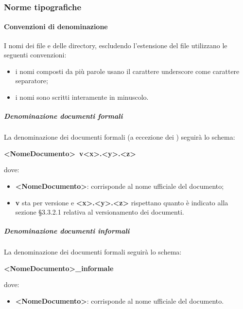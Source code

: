         \subsubsection{Norme tipografiche}
            \paragraph{Convenzioni di denominazione}
                I nomi dei file e delle directory, escludendo l’estensione del file utilizzano le seguenti convenzioni:\\
                \begin{itemize}
                    \item i nomi composti da più parole usano il carattere underscore come carattere separatore;
                    \item i nomi sono scritti interamente in minuscolo.
                \end{itemize}
                \subparagraph{Denominazione documenti formali}
                    La denominazione dei documenti formali (a eccezione dei ) seguirà lo schema:  \\
                    \begin{center}
                        \textbf{<NomeDocumento>\ v<x>.<y>.<z>}
                    \end{center}
                    dove: \\
                    \begin{itemize}
                        \item\textbf{<NomeDocumento>}: corrisponde al nome ufficiale del documento; 
                        \item\textbf{v} sta per versione e \textbf{<x>.<y>.<z>} rispettano quanto è indicato alla sezione §3.3.2.1 relativa al versionamento dei documenti.
                    \end{itemize}
                \subparagraph{Denominazione documenti informali}
                    La denominazione dei documenti formali seguirà lo schema:  \\
                    \begin{center}
                        \textbf{<NomeDocumento>\_informale}
                    \end{center}
                    dove: \\
                    \begin{itemize}
                        \item\textbf{<NomeDocumento>}: corrisponde al nome ufficiale del documento.
                    \end{itemize}
